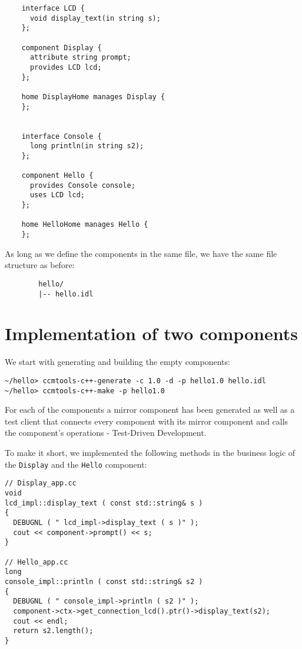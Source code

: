\begin{verbatim}
    interface LCD {
      void display_text(in string s);
    };

    component Display {
      attribute string prompt;
      provides LCD lcd;
    };

    home DisplayHome manages Display {
    };


    interface Console {
      long println(in string s2);
    };

    component Hello {
      provides Console console;
      uses LCD lcd;
    };

    home HelloHome manages Hello {
    };
\end{verbatim}

\noindent
As long as we define the components in the same file, we have the same file structure
as before:  
\begin{verbatim}
        hello/
        |-- hello.idl
\end{verbatim}



\section{Implementation of two components}

We start with generating and building the empty components:
\begin{verbatim}
~/hello> ccmtools-c++-generate -c 1.0 -d -p hello1.0 hello.idl
~/hello> ccmtools-c++-make -p hello1.0
\end{verbatim}

\noindent
For each of the components a mirror component has been generated as well as a
test client that connects every component with its mirror component and calls 
the component's operations - Test-Driven Development.

To make it short, we implemented the following methods in the business logic
of the {\tt Display} and the {\tt Hello} component:
\begin{verbatim}
// Display_app.cc
void
lcd_impl::display_text ( const std::string& s )
{
  DEBUGNL ( " lcd_impl->display_text ( s )" );
  cout << component->prompt() << s;
}

// Hello_app.cc
long
console_impl::println ( const std::string& s2 )
{
  DEBUGNL ( " console_impl->println ( s2 )" );
  component->ctx->get_connection_lcd().ptr()->display_text(s2);
  cout << endl;
  return s2.length();	
}
\end{verbatim}

